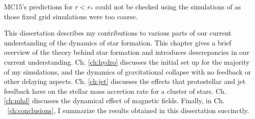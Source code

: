 \documentclass[../dissertation.tex]{subfiles}
\begin{document}
MC15's predictions for $r<r_*$ could not be checked using the simulations
of \citet{2015ApJ...800...49L} as those fixed grid simulations were
too coarse.  

This dissertation describes my contributions to various parts of our current understanding of the dynamics of star formation. 
This chapter gives a brief overview of the theory behind star formation and introduces descrepancies in our current understanding. 
Ch. \ref{ch:hydro} discusses the initial set up for the majority of my simulations, and the dynamics of gravitational collapse with no feedback or other delaying aspects.
Ch. \ref{ch:jet} discusses the effects that protostellar and jet feedback have on the stellar mass accretion rate for a cluster of stars.
Ch. \ref{ch:mhd} discusses the dynamical effect of magnetic fields. %
Finally, in Ch. ~\ref{ch:conclusions}, I summarize the results obtained in this dissertation succinctly.
\end{document}
